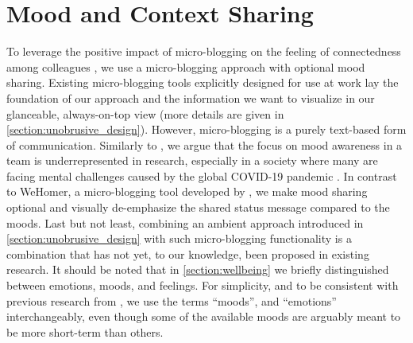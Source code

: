\section{Mood and Context Sharing}
To leverage the positive impact of micro-blogging on the feeling of connectedness among colleagues \autocite{dullemond2013fixing}, we use a micro-blogging approach with optional mood sharing. 
Existing micro-blogging tools explicitly designed for use at work lay the foundation of our approach and the information we want to visualize in our glanceable, always-on-top view (more details are given in \autoref{section:unobrusive_design}). However, micro-blogging is a purely text-based form of communication.
Similarly to \autocite{mora2011supporting}, we argue that the focus on mood awareness in a team is underrepresented in research, especially in a society where many are facing mental challenges caused by the global COVID-19 pandemic \autocite{mswellbeing}. 
In contrast to WeHomer, a micro-blogging tool developed by \textcite{dullemond2013fixing}, we make mood sharing optional and visually de-emphasize the shared status message compared to the moods. Last but not least, combining an ambient approach introduced in \autoref{section:unobrusive_design} with such micro-blogging functionality is a combination that has not yet, to our knowledge, been proposed in existing research. It should be noted that in \autoref{section:wellbeing} we briefly distinguished between emotions, moods, and feelings. For simplicity, and to be consistent with previous research from \textcite{dullemond2013fixing}, we use the terms \enquote{moods}, and \enquote{emotions} interchangeably, even though some of the available moods are arguably meant to be more short-term than others.

